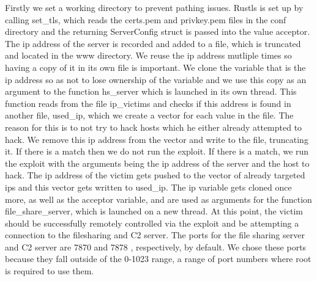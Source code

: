 \documentclass[../main.tex]{subfiles}
\begin{document}
Firstly we set a working directory to prevent pathing issues.
Rustls is set up by calling set\_tls, which reads the certs.pem and privkey.pem files in the conf directory and the returning ServerConfig struct is passed into the value acceptor. 
The ip address of the server is recorded and added to a file, which is truncated and located in the www directory. We reuse the ip address mutliple times so having a copy of it in its own 
file is important. We clone
the variable that is the ip address so as not to lose ownership of the variable and we use this copy as an argument to the function hs\_server which is launched in its own thread.
This function reads from the file ip\_victims and checks if this address is found in another file, used\_ip, which we create a vector for each value in the file. The reason for this is 
to not try to hack hosts which he either already attempted to hack. We remove this ip address from the vector and write to the file, truncating it. If there is a match then we do not
run the exploit. If there is a match, we run the exploit with the arguments being the ip address of the server and the host to hack. The ip address of the victim gets pushed to the 
vector of already targeted ips and this vector gets written to used\_ip. The ip variable gets cloned once more, as well as the acceptor variable, and are used as arguments for the function file\_share\_server, which is launched on a new thread. 
At this point, the victim should be successfully remotely controlled via the exploit and be attempting a 
connection to the filesharing and C2 server. The ports for the file sharing server and C2 server are 7870 and 7878 , respectively, by default. We
chose these ports because they fall outside of the 0-1023 range, a range of port numbers where root is required to use them.

	\vspace{10pt}
\end{document}
